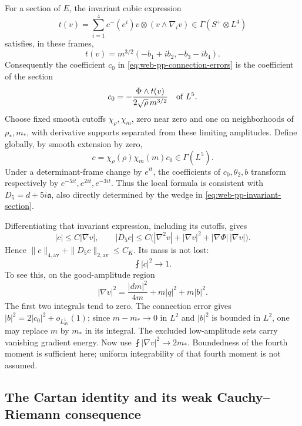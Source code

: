 For a section of \(E\), the invariant cubic expression
\[
 t(v)=\sum_{i=1}^4c^-(e^i)v\otimes(v\wedge\nabla_i v)
 \in\Gamma(S^+\otimes L^4)
\]
satisfies, in these frames,
\[
 t(v)=m^{3/2}(-b_1+ib_2,-b_3-ib_4).
\]
Consequently the coefficient \(c_0\) in
\eqref{eq:web-pp-connection-errors} is the coefficient of the section
\begin{equation}
 c_0=-\frac{\Phi\wedge t(v)}{2\sqrt\rho\,m^{3/2}}
 \quad\hbox{of }L^5.
 \label{eq:web-pp-invariant-section}
\end{equation}
Choose fixed smooth cutoffs \(\chi_\rho,\chi_m\), zero near zero and one
on neighborhoods of \(\rho_*,m_*\), with derivative supports separated
from these limiting amplitudes.  Define globally, by smooth extension by zero,
\begin{equation}
 c=\chi_\rho(\rho)\chi_m(m)c_0\in\Gamma(L^5).
 \label{eq:web-pp-global-section}
\end{equation}
Under a determinant-frame change by \(e^{it}\), the coefficients of
\(c_0,\theta_2,b\) transform respectively by
\(e^{-5it},e^{2it},e^{-3it}\).  Thus the local formula is consistent
with \(D_5=d+5i\mathfrak a\), also directly determined by the wedge in
\eqref{eq:web-pp-invariant-section}.

Differentiating that invariant expression, including its cutoffs, gives
\begin{equation}
 |c|\le C|\nabla v|,
 \qquad |D_5c|\le C\bigl(|\nabla^2v|+|\nabla v|^2
                    +|\nabla\Phi|\,|\nabla v|\bigr).
 \label{eq:web-pp-section-budget}
\end{equation}
Hence \(\|c\|_{4,\mathrm{av}}+\|D_5c\|_{2,\mathrm{av}}\le C_K\).
Its mass is not lost:
\begin{equation}
 \fint|c|^2\longrightarrow1.
 \label{eq:web-pp-positive-mass}
\end{equation}
To see this, on the good-amplitude region
\[
 |\nabla v|^2=\frac{|dm|^2}{4m}+m|q|^2+m|b|^2.
\]
The first two integrals tend to zero.  The connection error gives
\(|b|^2=2|c_0|^2+o_{L^1_{\mathrm{av}}}(1)\); since
\(m-m_*\to0\) in \(L^2\) and \(|b|^2\) is bounded in \(L^2\),
one may replace \(m\) by \(m_*\) in its integral.  The excluded
low-amplitude sets carry vanishing gradient energy.  Now use
\(\fint|\nabla v|^2\to2m_*\).  Boundedness of the fourth moment is
sufficient here; uniform integrability of that fourth moment is not assumed.

\subsection{The Cartan identity and its weak Cauchy--Riemann consequence}

